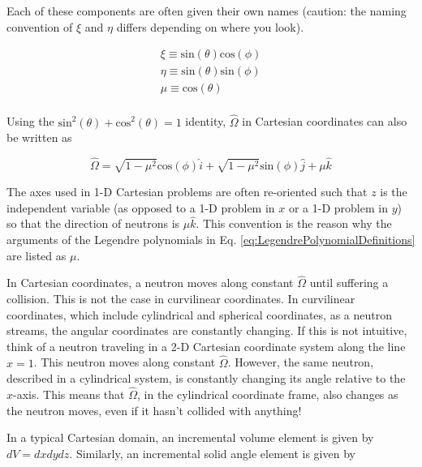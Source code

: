 \documentclass[10pt]{article}
\begin{document}
\begin{flushleft}
Each of these components are often given their own names (caution: the naming convention of \(\xi\) and \(\eta\) differs depending on where you look). 

\begin{equation}
\label{eq:OmegaComponentsCartesian}
\begin{aligned}
 \xi \equiv \textrm{sin}(\theta)\textrm{cos}(\phi)\\
 \eta \equiv \textrm{sin}(\theta)\textrm{sin}(\phi)\\
 \mu \equiv \textrm{cos}(\theta)\\
\end{aligned}
\end{equation}

Using the \(\textrm{sin}^2(\theta) + \textrm{cos}^2(\theta) = 1\) identity, \(\hat{\Omega}\) in Cartesian coordinates can also be written as

\begin{equation}
\label{eq:OmegaCartesianMuOnly}
\hat{\Omega} = \sqrt{1-\mu^2}\textrm{cos}(\phi)\hat{i} + \sqrt{1-\mu^2}\textrm{sin}(\phi)\hat{j} + \mu\hat{k}
\end{equation}

The axes used in 1-D Cartesian problems are often re-oriented such that \(z\) is the independent variable (as opposed to a 1-D problem in \(x\) or a 1-D problem in \(y\)) so that the direction of neutrons is \(\mu\hat{k}\). This convention is the reason why the arguments of the Legendre polynomials in Eq. \ref{eq:LegendrePolynomialDefinitions} are listed as \(\mu\). 

In Cartesian coordinates, a neutron moves along constant \(\hat{\Omega}\) until suffering a collision. This is not the case in curvilinear coordinates. In curvilinear coordinates, which include cylindrical and spherical coordinates, as a neutron streams, the angular coordinates are constantly changing. If this is not intuitive, think of a neutron traveling in a 2-D Cartesian coordinate system along the line \(x = 1\). This neutron moves along constant \(\hat{\Omega}\). However, the same neutron, described in a cylindrical system, is constantly changing its angle relative to the \(x\)-axis. This means that \(\hat{\Omega}\), in the cylindrical coordinate frame, also changes as the neutron moves, even if it hasn't collided with anything!

In a typical Cartesian domain, an incremental volume element is given by \(dV = dxdydz\). Similarly, an incremental solid angle element is given by 


\end{flushleft}
\end{document}
